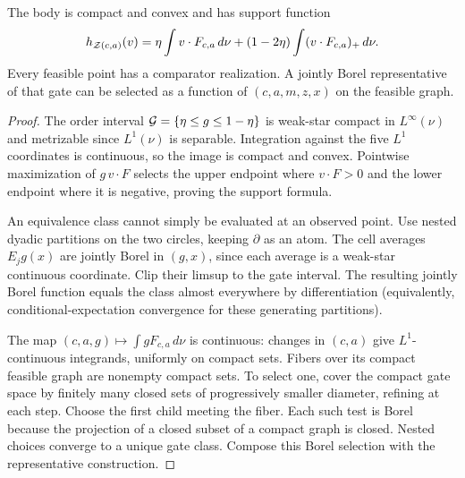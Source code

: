 \begin{lemma}\label{lem:body}
The body is compact and convex and has support function
\begin{equation}
 h_{\mathcal Z(c,a)}(v)=\eta\int v\cdot F_{c,a}\,d\nu
 +(1-2\eta)\int(v\cdot F_{c,a})_+\,d\nu.
 \label{eq:support}
\end{equation}
Every feasible point has a comparator realization. A jointly Borel representative of that gate can be selected as a function of $(c,a,m,z,x)$ on the feasible graph.
\end{lemma}
\begin{proof}
The order interval $\mathcal G=\{\eta\le g\le1-\eta\}$ is weak-star compact in $L^\infty(\nu)$ and metrizable since $L^1(\nu)$ is separable. Integration against the five $L^1$ coordinates is continuous, so the image is compact and convex. Pointwise maximization of $g\,v\cdot F$ selects the upper endpoint where $v\cdot F>0$ and the lower endpoint where it is negative, proving the support formula.

An equivalence class cannot simply be evaluated at an observed point. Use nested dyadic partitions on the two circles, keeping $\partial$ as an atom. The cell averages $E_jg(x)$ are jointly Borel in $(g,x)$, since each average is a weak-star continuous coordinate. Clip their limsup to the gate interval. The resulting jointly Borel function equals the class almost everywhere by differentiation (equivalently, conditional-expectation convergence for these generating partitions).

The map $(c,a,g)\mapsto\int gF_{c,a}\,d\nu$ is continuous: changes in $(c,a)$ give $L^1$-continuous integrands, uniformly on compact sets. Fibers over its compact feasible graph are nonempty compact sets. To select one, cover the compact gate space by finitely many closed sets of progressively smaller diameter, refining at each step. Choose the first child meeting the fiber. Each such test is Borel because the projection of a closed subset of a compact graph is closed. Nested choices converge to a unique gate class. Compose this Borel selection with the representative construction.
\end{proof}


